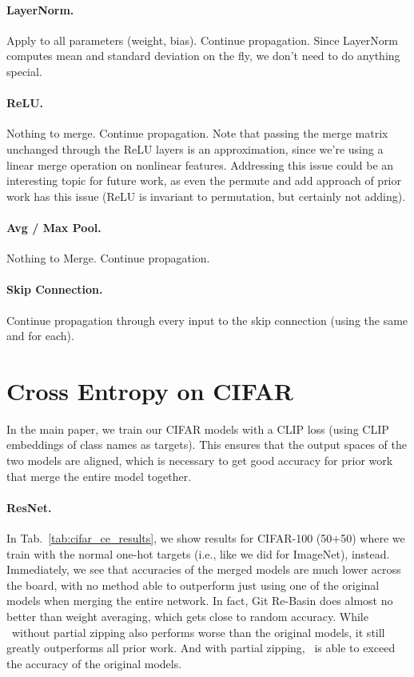 \paragraph{LayerNorm.} Apply  to all parameters (weight, bias). Continue propagation. Since LayerNorm computes mean and standard deviation on the fly, we don't need to do anything special.

\paragraph{ReLU.} Nothing to merge. Continue propagation. Note that passing the merge matrix unchanged through the ReLU layers is an approximation, since we're using a linear merge operation on nonlinear features. Addressing this issue could be an interesting topic for future work, as even the permute and add approach of prior work has this issue (ReLU is invariant to permutation, but certainly not adding). 

\paragraph{Avg / Max Pool.} Nothing to Merge. Continue propagation.

\paragraph{Skip Connection.} Continue propagation through every input to the skip connection (using the same  and  for each).


\section{Cross Entropy on CIFAR}

In the main paper, we train our CIFAR models with a CLIP \cite{radford2021learning} loss (using CLIP embeddings of class names as targets). This ensures that the output spaces of the two models are aligned, which is necessary to get good accuracy for prior work that merge the entire model together. 

\paragraph{ResNet.} In Tab.~\ref{tab:cifar_ce_results}, we show results for CIFAR-100 (50+50) where we train with the normal one-hot targets (i.e., like we did for ImageNet), instead. Immediately, we see that accuracies of the merged models are much lower across the board, with no method able to outperform just using one of the original models when merging the entire network. In fact, Git Re-Basin \cite{ainsworth2022git} does almost no better than weight averaging, which gets close to random accuracy. While \name{}\ without partial zipping also performs worse than the original models, it still greatly outperforms all prior work. And with partial zipping, \name{}\ is able to exceed the accuracy of the original models.

